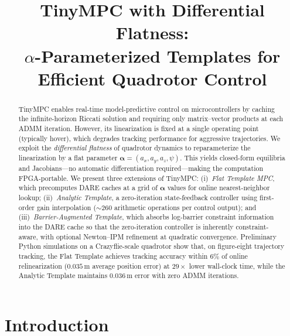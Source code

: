 \documentclass[letterpaper, 10pt, conference]{IEEEtran}
\newcommand{\balpha}{\bm{\alpha}}
\begin{document}
\title{TinyMPC with Differential Flatness:\\
  $\alpha$-Parameterized Templates for Efficient Quadrotor Control}

\author{
}

\maketitle

\begin{abstract}
TinyMPC enables real-time model-predictive control on microcontrollers
by caching the infinite-horizon Riccati solution and requiring
only matrix--vector products at each ADMM iteration.
However, its linearization is fixed at a single operating point
(typically hover), which degrades tracking performance for aggressive
trajectories.
We exploit the \emph{differential flatness} of quadrotor dynamics
to reparameterize the linearization by a flat parameter
$\balpha = (a_x, a_y, a_z, \psi)$.
This yields closed-form equilibria and Jacobians---no automatic
differentiation required---making the computation FPGA-portable.
We present three extensions of TinyMPC:
(i)~\emph{Flat Template MPC}, which precomputes DARE caches at a grid
of $\balpha$ values for online nearest-neighbor lookup;
(ii)~\emph{Analytic Template}, a zero-iteration state-feedback
controller using first-order gain interpolation (${\sim}260$
arithmetic operations per control output);
and (iii)~\emph{Barrier-Augmented Template}, which absorbs
log-barrier constraint information into the DARE cache so
that the zero-iteration controller is inherently constraint-aware,
with optional Newton--IPM refinement at quadratic convergence.
Preliminary Python simulations on a Crazyflie-scale quadrotor show
that, on figure-eight trajectory tracking,
the Flat Template achieves tracking accuracy within 6\% of
online relinearization ($0.035$\,m average position error)
at $29\times$ lower wall-clock time,
while the Analytic Template maintains $0.036$\,m error with
zero ADMM iterations.
\end{abstract}

\section{Introduction}\label{sec:intro}
\end{document}
